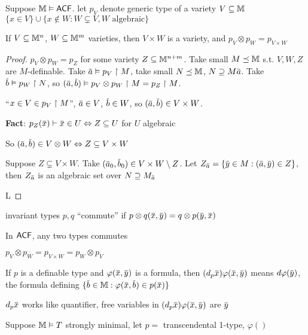 \documentclass[11pt]{article}
\begin{document}
\begin{examplle}[]
Suppose \(\mathbb{M}\vDash\textsf{ACF}\). let \(p_V\) denote generic type of a variety \(V\subseteq\mathbb{M}\)
\(\{x\in V\}\cup\{x\notin W:W\subsetneq V, W\text{ algebraic}\}\)

If \(V\subseteq\mathbb{M}^n\), \(W\subseteq \mathbb{M}^m\) varieties, then \(V\times W\) is a variety, and \(p_V\otimes p_W=p_{V\times W}\)
\end{examplle}

\begin{proof}
\(p_V\otimes p_W=p_Z\) for some variety \(Z\subseteq\mathbb{M}^{n+m}\). Take small \(M\preceq\mathbb{M}\) s.t. \(V,W,Z\)
are \(M\)-definable. Take \(\bara\vDash p_V\uhr M\), take small \(N\preceq\mathbb{M}\), \(N\supseteq M\bara\).
Take \(\barb\vDash p_W\uhr N\), so \((\bara,\barb)\vDash p_V\otimes p_W\uhr M=p_Z\uhr M\).

``\(x\in V\in p_V\upharpoonright M\)'', \(\bara\in V\), \(\barb\in W\), so \((\bara,\barb)\in V\times W\).

\textbf{Fact}: \(p_Z(\barx)\vdash\barx\in U\Leftrightarrow Z\subseteq U\) for \(U\) algebraic

So \((\bara,\barb)\in V\otimes W\Leftrightarrow Z\subseteq V\times W\)

Suppose \(Z\subsetneq V\times W\). Take \((\bara_0,\barb_0)\in V\times W\setminus Z\).
Let \(Z_{\bara}=\{\bary\in M:(\bara,\bary)\in Z\}\), then \(Z_{\bara}\) is an algebraic set
over \(N\supseteq M_{\bara}\)

L
\end{proof}

\begin{definition}[]
invariant types \(p,q\) ``commute'' if \(p\otimes q(\barx,\bary)=q\otimes p(\bary,\barx)\)
\end{definition}

\begin{examplle}[]
In \(\textsf{ACF}\), any two types commutes

\(p_V\otimes p_W=p_{V\times W}=p_W\otimes p_V\)
\end{examplle}

If \(p\) is a definable type and \(\varphi(\barx,\bary)\) is a formula,
then \((d_p\barx)\varphi(\barx,\bary)\) means \(d\varphi(\bary)\), the formula
defining \(\{\barb\in\M:\varphi(\barx,\barb)\in p(\barx)\}\)

\(d_p\barx\) works like quantifier, free variables in \((d_p\barx)\varphi(\barx,\bary)\) are \(\bary\)

\begin{examplle}[]
Suppose \(\mathbb{M}\vDash T\) strongly minimal, let \(p=\) transcendental 1-type, \(\varphi()\)
\end{examplle}
\end{document}
